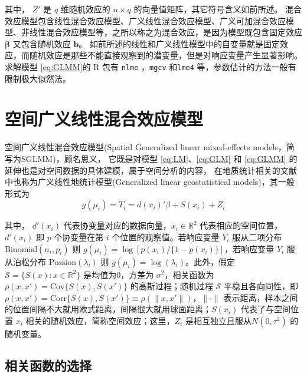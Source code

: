 \documentclass[hyperref, a4paper, UTF8, zihao = -4, linespread = 1.25, scheme = chinese]{ctexbook}
\begin{document}
其中， \(Z'\) 是 \(q\) 维随机效应的 \(n \times q\)
的向量值矩阵，其它符号含义如前所述。
混合效应模型包含线性混合效应模型、广义线性混合效应模型、广义可加混合效应模型、非线性混合效应模型等，之所以称之为混合效应，是因为模型既包含固定效应
\(\boldsymbol{\beta}\) 又包含随机效应 \(\mathbf{b}\)。
如前所述的线性和广义线性模型中的自变量就是固定效应，而随机效应是那些不能直接观察到的潜变量，但是对响应变量产生显著影响。求解模型
\eqref{eq:GLMM}的 R 包有 \texttt{nlme} \citep{R-nlme}，\texttt{mgcv}
\citep{mgcv2017} 和\texttt{lme4}\citep{lme4JSS}
等，参数估计的方法一般有限制极大似然法。

\section{空间广义线性混合效应模型}

空间广义线性混合效应模型(Spatial Generalized linear mixed-effects
models，简写为SGLMM)，顾名思义， 它既是对模型 \eqref{eq:LM}、\eqref{eq:GLM}
和 \eqref{eq:GLMM} 的延伸也是对空间数据的具体建模，属于空间分析的内容，
在地质统计相关的文献中也称为广义线性地统计模型(Generalized linear
geostatistical models)\citep{Diggle2007}，其一般形式为\begin{equation}
g(\mu_i) = T_{i} = d(x_i)'\beta + S(x_i) + Z_i \label{eq:SGLMM}
\end{equation}

其中， \(d'(x_i)\) 代表协变量对应的数据向量，\(x_i \in \mathbb{R}^2\)
代表相应的空间位置，\(d'(x_i)\) 即 \(p\) 个协变量在第 \(i\)
个位置的观察值。若响应变量 \(Y_i\) 服从二项分布
\(\mathrm{Binomial}(n_i,p_i)\) 则
\(g(\mu_i) = \log[p(x_i)/\{1-p(x_i)\}]\)，若响应变量 \(Y_i\)
服从泊松分布 \(\mathrm{Possion}(\lambda_i)\) 则
\(g(\mu_i) = \log(\lambda_i)\)。此外，假定
\(\mathcal{S} = \{S(x): x \in \mathbb{R}^2\}\) 是均值为0，方差为
\(\sigma^2\)，相关函数为 \(\rho(x,x') = \mathrm{Cov}\{S(x),S(x')\}\)
的高斯过程；随机过程 \(\mathcal{S}\) 平稳且各向同性，即
\(\rho(x,x') = \mathrm{Corr}\{S(x),S(x')\} \equiv \rho(\|x,x'\|)\)，\(\|\cdot\|\)
表示距离，样本之间的位置间隔不大就用欧式距离，间隔很大就用球面距离；\(S(x_i)\)
代表了与空间位置 \(x_i\) 相关的随机效应，简称空间效应；这里，\(Z_i\)
是相互独立且服从\(N(0,\tau^2)\) 的随机变量。

\subsection{相关函数的选择}
\end{document}
